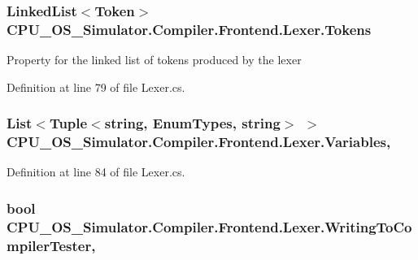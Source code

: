 \subsubsection[{Tokens}]{\setlength{\rightskip}{0pt plus 5cm}Linked\+List$<${\bf Token}$>$ C\+P\+U\+\_\+\+O\+S\+\_\+\+Simulator.\+Compiler.\+Frontend.\+Lexer.\+Tokens\hspace{0.3cm}{\ttfamily [get]}}\label{class_c_p_u___o_s___simulator_1_1_compiler_1_1_frontend_1_1_lexer_a08611849f2bad0c53f5707d15dbdc840}


Property for the linked list of tokens produced by the lexer 



Definition at line 79 of file Lexer.\+cs.

\hypertarget{class_c_p_u___o_s___simulator_1_1_compiler_1_1_frontend_1_1_lexer_abb832df2e4dc0a135eca9e20aeafc25f}{}
\subsubsection[{Variables}]{\setlength{\rightskip}{0pt plus 5cm}List$<$Tuple$<$string, {\bf Enum\+Types}, string$>$ $>$ C\+P\+U\+\_\+\+O\+S\+\_\+\+Simulator.\+Compiler.\+Frontend.\+Lexer.\+Variables\hspace{0.3cm}{\ttfamily [get]}, {\ttfamily [set]}}\label{class_c_p_u___o_s___simulator_1_1_compiler_1_1_frontend_1_1_lexer_abb832df2e4dc0a135eca9e20aeafc25f}


Definition at line 84 of file Lexer.\+cs.

\hypertarget{class_c_p_u___o_s___simulator_1_1_compiler_1_1_frontend_1_1_lexer_ab036c4c1dbff32b7a8a54d58f4c4195c}{}
\subsubsection[{Writing\+To\+Compiler\+Tester}]{\setlength{\rightskip}{0pt plus 5cm}bool C\+P\+U\+\_\+\+O\+S\+\_\+\+Simulator.\+Compiler.\+Frontend.\+Lexer.\+Writing\+To\+Compiler\+Tester\hspace{0.3cm}{\ttfamily [get]}, {\ttfamily [set]}}\label{class_c_p_u___o_s___simulator_1_1_compiler_1_1_frontend_1_1_lexer_ab036c4c1dbff32b7a8a54d58f4c4195c}


